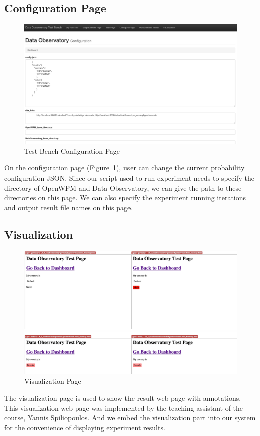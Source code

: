 \documentclass[fleqn,12pt]{SelfArx} %
\begin{document}
\subsection{Configuration Page}
\begin{figure}[h!]
	\includegraphics[width=\linewidth]{configurationpage.jpg}
    \caption{Test Bench Configuration Page}
    \label{fig:configuration}
\end{figure}
On the configuration page (Figure~\ref{fig:configuration}), user can change the current probability configuration JSON. Since our script used to run experiment needs to specify the directory of OpenWPM and Data Observatory, we can give the path to these directories on this page. We can also specify the experiment running iterations and output result file names on this page. 

\subsection{Visualization}
\begin{figure}[h!]
	\includegraphics[width=\linewidth]{visualization.jpg}
    \caption{Visualization Page}
    \label{fig:visualization}
\end{figure}
The visualization page is used to show the result web page with annotations. This visualization web page was implemented by the teaching assistant of the course, Yannis Spiliopoulos. And we embed the visualization part into our system for the convenience of displaying experiment results.
\end{document}
